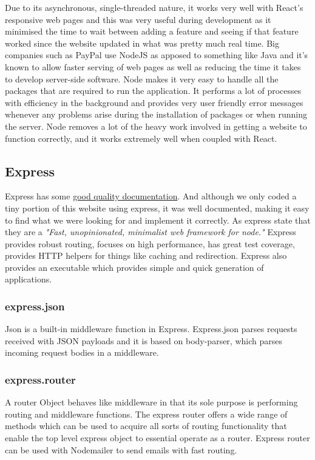 Due to its asynchronous, single-threaded nature, it works very well with React's responsive web pages and this was very useful during development as it minimised the time to wait between adding a feature and seeing if that feature worked since the website updated in what was pretty much real time. \cite{PaypalNodeJS}Big companies such as PayPal use NodeJS as apposed to something like Java and it's known to allow faster serving of web pages as well as reducing the time it takes to develop server-side software.\newline
Node makes it very easy to handle all the packages that are required to run the application. It performs a lot of processes with efficiency in the background and provides very user friendly error messages whenever any problems arise during the installation of packages or when running the server. Node removes a lot of the heavy work involved in getting a website to function correctly, and it works extremely well when coupled with React.

\subsection{Express}
Express has some \href{https://expressjs.com/en/5x/api.html}{good quality documentation}. And although we only coded a tiny portion of this website using express, it was well documented, making it easy to find what we were looking for and implement it correctly. As express state that they are a \cite{ExpressRM}\emph{"Fast, unopinionated, minimalist web framework for node."} Express provides robust routing, focuses on high performance, has great test coverage, provides HTTP helpers for things like caching and redirection. Express also provides an executable which provides simple and quick generation of applications. 

\subsubsection{express.json} 
Json is a built-in middleware function in Express. Express.json parses requests received with JSON payloads and it is based on body-parser, which parses incoming request bodies in a middleware. 

\subsubsection{express.router}
A router Object behaves like middleware in that its sole purpose is performing routing and middleware functions. The express router offers a wide range of methods which can be used to acquire all sorts of routing functionality that enable the top level express object to essential operate as a router. Express router can be used with Nodemailer to send emails with fast routing.

